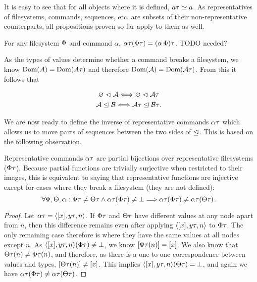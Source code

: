It is easy to see that for all objects where it is defined, $a\tau\simeq a$.
As representatives of filesystems, commands, sequences, etc.
are subsets of their non-representative counterparts, all
propositions proven so far apply to them as well.

\begin{mycor}\label{cor_typemap_transitive}
For any filesystem $\Phi$ and command $\alpha$, 
$\alpha\tau(\Phi\tau) = (\alpha\,\Phi)\tau$.
TODO needed?
\end{mycor}


As the types of values determine whether a command breaks a filesystem,
we know $\textrm{Dom}({A})=\textrm{Dom}({A\tau})$ and therefore $\textrm{Dom}({\mathcal{A}})=\textrm{Dom}({\mathcal{A}\tau})$.
From this it follows that

\begin{mycor}\label{repr_works_is_same}
\begin{gather*}
{\varnothing}\vartriangleleft{\mathcal{A}} \Longleftrightarrow {\varnothing}\vartriangleleft{\mathcal{A}\tau} \\
{\mathcal{A}}\trianglelefteq{\mathcal{B}} \Longleftrightarrow {\mathcal{A}\tau}\trianglelefteq{\mathcal{B}\tau}.
\end{gather*}
\end{mycor}


We are now ready to define the inverse of representative commands $\alpha\tau$
which allows us to move parts of sequences between the
two sides of $\trianglelefteq$.
This is based on the following observation.

\begin{mylem}\label{repr_comm_inject}
Representative commands $\alpha\tau$ are partial bijections over representative filesystems ($\Phi\tau$).
Because partial functions are trivially surjective when restricted to their images, this is
equivalent to saying that representative functions are injective except for cases
where they break a filesystem (they are not defined):
\[ \forall\Phi,\Theta,\alpha: \Phi\tau\neq\Theta\tau \wedge \alpha\tau(\Phi\tau)\neq\bot \Longrightarrow \alpha\tau(\Phi\tau) \neq \alpha\tau(\Theta\tau). \]
\end{mylem}
\begin{proof}
Let $\alpha\tau = \langle{[x],{y}\tau,n}\rangle$.
If $\Phi\tau$ and $\Theta\tau$ have different values at any node apart from $n$, then this difference remains
even after applying $\langle{[x],{y}\tau,n}\rangle$ to $\Phi\tau$. The only remaining case therefore is where they have the same values
at all nodes except $n$.
As $\langle{[x],{y}\tau,n}\rangle(\Phi\tau)\neq\bot$, we know $[\Phi\tau(n)]=[x]$.
We also know that $\Theta\tau(n)\neq\Phi\tau(n)$, and therefore, as there is a one-to-one correspondence between values and types,
$[\Theta\tau(n)]\neq[x]$.
This implies $\langle{[x],{y}\tau,n}\rangle(\Theta\tau)=\bot$,
and again we have $\alpha\tau(\Phi\tau) \neq \alpha\tau(\Theta\tau)$.
\end{proof}

